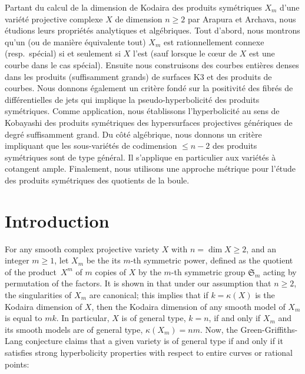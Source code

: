 \documentclass[JEP,XML,SOM,Unicode, NoEqCountersInSection,NoFloatCountersInSection,published]{cedram}
\theoremstyle{theorem}
\theoremstyle{definition}
\begin{document}




\begin{altabstract}
Partant du calcul de la dimension de Kodaira des produits symétriques $X_m$ d'une variété projective complexe $X$ de dimension $n \geq 2$ par Arapura et Archava, nous étudions leurs propriétés analytiques et algébriques. Tout d'abord, nous montrons qu'un (ou de manière équivalente tout) $X_m$ est ration\-nellement connexe (resp.\ spécial) si et seulement si $X$ l'est (sauf lorsque le c{\oe}ur de $X$ est une courbe dans le cas spécial). Ensuite nous construisons des courbes entières denses dans les produits (suffisamment grands) de surfaces K3 et des produits de courbes. Nous donnons également un critère fondé sur la positivité des fibrés de différentielles de jets qui implique la pseudo-hyperbolicité des produits symétriques. Comme application, nous établissons l'hyperbolicité au sens de Kobayashi des produits symétriques des hypersurfaces projectives génériques de degré suffisamment grand. Du côté algébrique, nous donnons un critère impliquant que les sous-variétés de codimension $\leq n-2$  des produits symétriques sont de type général. Il s'applique en particulier aux variétés à cotangent ample. Finalement, nous utilisons une approche métrique pour l'étude des produits symétriques des quotients de la boule.
\end{altabstract}

\maketitle

\tableofcontents
\mainmatter

\section{Introduction}
For any smooth complex projective variety $X$ with $n=\dim X \geq 2$, and an integer $m\geq 1$, let $X_m$ be the its $m$-th symmetric power, defined as the quotient of the product~$X^m$ of $m$ copies of $X$ by the $m$-th symmetric group $\mathfrak{S}_m$ acting by permutation of the factors. It is shown in \cite{AA02} that under our assumption that \(n \geq 2\), the singularities of $X_m$ are canonical; this implies that if $k=\kappa(X)$ is the Kodaira dimension of $X$, then the Kodaira dimension of any smooth model of $X_m$ is equal to $mk$. In particular, $X$ is of general type, \ie $k=n$, if and only if $X_m$ and its smooth models are of general type, \ie $\kappa(X_m)=nm$. Now, the Green-Griffiths-Lang conjecture claims that a given variety is of general type if and only if it satisfies strong hyperbolicity properties with respect to entire curves or rational points:
\end{document}
